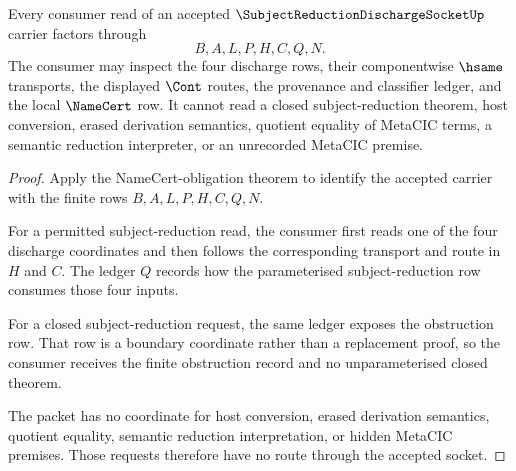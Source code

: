 \begin{theorem}
\label{thm:subject-reduction-discharge-socket-nonescape}
Every consumer read of an accepted $\SubjectReductionDischargeSocketUp$ carrier factors through
$$
B,A,L,P,H,C,Q,N.
$$
The consumer may inspect the four discharge rows, their componentwise $\hsame$ transports, the displayed $\Cont$ routes, the provenance and classifier ledger, and the local $\NameCert$ row. It cannot read a closed subject-reduction theorem, host conversion, erased derivation semantics, quotient equality of MetaCIC terms, a semantic reduction interpreter, or an unrecorded MetaCIC premise.
\end{theorem}
\begin{proof}
Apply the NameCert-obligation theorem to identify the accepted carrier with the finite rows $B,A,L,P,H,C,Q,N$.

For a permitted subject-reduction read, the consumer first reads one of the four discharge coordinates and then follows the corresponding transport and route in $H$ and $C$. The ledger $Q$ records how the parameterised subject-reduction row consumes those four inputs.

For a closed subject-reduction request, the same ledger exposes the obstruction row. That row is a boundary coordinate rather than a replacement proof, so the consumer receives the finite obstruction record and no unparameterised closed theorem.

The packet has no coordinate for host conversion, erased derivation semantics, quotient equality, semantic reduction interpretation, or hidden MetaCIC premises. Those requests therefore have no route through the accepted socket.
\end{proof}

